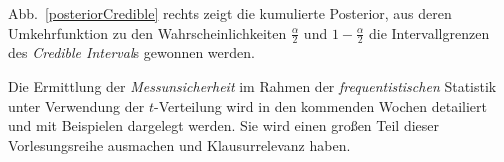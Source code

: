 Abb.~\ref{posteriorCredible} rechts zeigt die kumulierte Posterior, aus deren Umkehrfunktion
zu den Wahrscheinlichkeiten $\frac{\alpha}{2}$ und $1 - \frac{\alpha}{2}$ die
Intervallgrenzen des \textsl{Credible Interval}s gewonnen werden.

Die Ermittlung der \textsl{Messunsicherheit} im Rahmen der
\textsl{frequentistischen} Statistik unter Verwendung der $t$-Verteilung
wird in den kommenden Wochen detailiert und mit Beispielen dargelegt werden.
Sie wird einen großen Teil dieser Vorlesungsreihe ausmachen und Klausurrelevanz haben.

